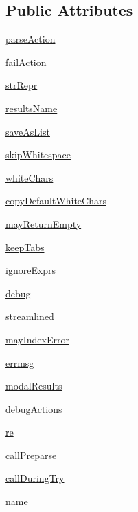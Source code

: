 \subsection*{Public Attributes}
\begin{DoxyCompactItemize}
\item 
\hyperlink{classpyparsing_1_1ParserElement_a479b30648437c4b8da8535395a23f985}{parse\+Action}
\item 
\hyperlink{classpyparsing_1_1ParserElement_a9eb5996aa57caa6b30b94a059bdf2a04}{fail\+Action}
\item 
\hyperlink{classpyparsing_1_1ParserElement_a7b203d949c094ad26eac08eeb0610129}{str\+Repr}
\item 
\hyperlink{classpyparsing_1_1ParserElement_a1708e3e715715c9f3a5112dceca431b3}{results\+Name}
\item 
\hyperlink{classpyparsing_1_1ParserElement_ac01772081d605dac64e692755a97c45e}{save\+As\+List}
\item 
\hyperlink{classpyparsing_1_1ParserElement_add26625bd703452a7f6b72d22a855398}{skip\+Whitespace}
\item 
\hyperlink{classpyparsing_1_1ParserElement_ad9fc7af4f67091521c56a11fd2f97598}{white\+Chars}
\item 
\hyperlink{classpyparsing_1_1ParserElement_a18b1fd95ba32ca70311f70ee89eb01ec}{copy\+Default\+White\+Chars}
\item 
\hyperlink{classpyparsing_1_1ParserElement_a0e47f9cef4b90ed7ffed972f2709f065}{may\+Return\+Empty}
\item 
\hyperlink{classpyparsing_1_1ParserElement_ad89de4310464b6cb9a09fda4617e4458}{keep\+Tabs}
\item 
\hyperlink{classpyparsing_1_1ParserElement_a35ca4a775c96907d923e4f1a14dd164a}{ignore\+Exprs}
\item 
\hyperlink{classpyparsing_1_1ParserElement_a527aba73da50c8212981c57bf9d6926e}{debug}
\item 
\hyperlink{classpyparsing_1_1ParserElement_a458b59687bb6fbd2e62bcd35a0070156}{streamlined}
\item 
\hyperlink{classpyparsing_1_1ParserElement_a50803f6eed71e23f3c5d74719af23f61}{may\+Index\+Error}
\item 
\hyperlink{classpyparsing_1_1ParserElement_a9942086111d72da5c13213b6f4d9a795}{errmsg}
\item 
\hyperlink{classpyparsing_1_1ParserElement_aed3e929a9e503667acde563c1effbd0e}{modal\+Results}
\item 
\hyperlink{classpyparsing_1_1ParserElement_ab5f944fef94392731c6c3b824323cec6}{debug\+Actions}
\item 
\hyperlink{classpyparsing_1_1ParserElement_abefb6a1af708572c3e1df5829f936029}{re}
\item 
\hyperlink{classpyparsing_1_1ParserElement_a9fa130e61f31c9db3cee5aa4eb501c51}{call\+Preparse}
\item 
\hyperlink{classpyparsing_1_1ParserElement_a2737fc1b8ea4435013df5bf4debb9fd9}{call\+During\+Try}
\item 
\hyperlink{classpyparsing_1_1ParserElement_ab51381d24c5bc721b4a4764af8d9b470}{name}
\end{DoxyCompactItemize}
